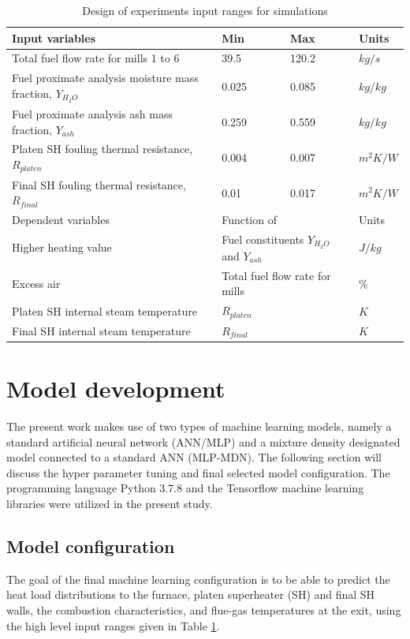 \documentclass[a4paper,fleqn]{cas-dc}
\begin{document}
\begin{table}[h!]
\caption{Design of experiments input ranges for  simulations}\label{tbl_doe}
\begin{tabular*}{\tblwidth}{p{}p{}p{}p{}}
\toprule
 Input variables& Min& Max& Units \\ %
\midrule
 Total fuel flow rate for mills 1 to 6 & 39.5 & 120.2 & $kg/s$ \\
 Fuel proximate analysis moisture mass fraction, $Y_{H_2O}$ & 0.025 & 0.085 & $kg/kg$ \\
 Fuel proximate analysis ash mass fraction, $Y_{ash}$  & 0.259 & 0.559 & $kg/kg$ \\
 Platen SH fouling thermal resistance, $R_{platen}$  & 0.004 & 0.007 & $m^2K/W$ \\
 Final SH fouling thermal resistance, $R_{final}$  &0.01 & 0.017 & $m^2K/W$ \\
\midrule
Dependent variables& \multicolumn{2}{l}{Function of}& Units\\
\midrule
Higher heating value&\multicolumn{2}{l}{Fuel constituents $Y_{H_2O}$ and $Y_{ash}$}&$J/kg$\\
Excess air & \multicolumn{2}{l}{Total fuel flow rate for mills} & $\%$\\
Platen SH internal steam temperature& \multicolumn{2}{l}{$R_{platen}$} & $K$\\
Final SH internal steam temperature& \multicolumn{2}{l}{$R_{final}$} & $K$\\
\bottomrule
\end{tabular*}
\end{table}
\section{Model development}
The present work makes use of two types of machine learning models, namely a standard artificial neural network (ANN/MLP) and a mixture density designated model connected to a standard ANN (MLP-MDN). The following section will discuss the hyper parameter tuning and final selected model configuration. The programming language Python 3.7.8 and the Tensorflow machine learning libraries were utilized in the present study. 
\subsection{Model configuration}
The goal of the final machine learning configuration is to be able to predict the heat load distributions to the furnace, platen superheater (SH) and final SH walls, the combustion characteristics, and flue-gas temperatures at the exit, using the high level input ranges given in Table \ref{tbl_doe}.\\
\end{document}

